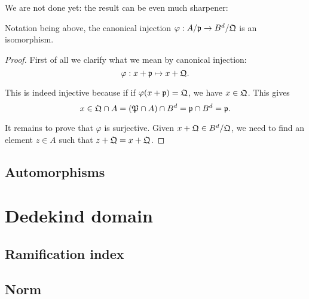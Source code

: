 		We are not done yet: the result can be even much sharpener:
		
		\begin{theorem}
			Notation being above, the canonical injection $\varphi:A/\mathfrak{p} \to B^d/\mathfrak{Q}$ is an isomorphism.
		\end{theorem}
		
		\begin{proof}
			First of all we clarify what we mean by canonical injection:
			\[
				\varphi:x + \mathfrak{p} \mapsto x + \mathfrak{Q}.
			\]
			
			This is indeed injective because if if $\varphi(x+\mathfrak{p})=\mathfrak{Q}$, we have $x \in \mathfrak{Q}$. This gives
			\[
				x \in \mathfrak{Q} \cap A = (\mathfrak{P} \cap A) \cap B^d = \mathfrak{p} \cap B^d = \mathfrak{p}.
			\]
			
			It remains to prove that $\varphi$ is surjective. Given $x + \mathfrak{Q} \in B^d/\mathfrak{Q}$, we need to find an element $z \in A$ such that $z + \mathfrak{Q} = x + \mathfrak{Q}$. 
			
		\end{proof}
		
		
		\subsection{Automorphisms}
	\section{Dedekind domain}
		
		\subsection{Ramification index}
		
		\subsection{Norm}
		
